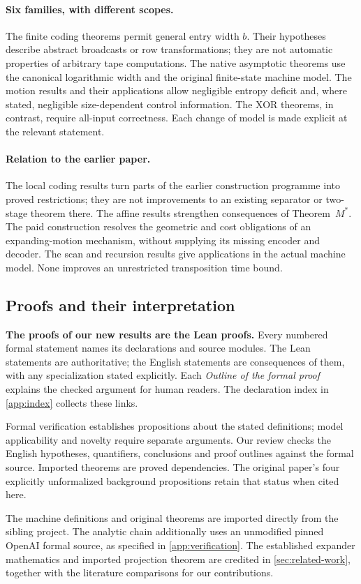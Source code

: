 \paragraph{Six families, with different scopes.}
The finite coding theorems permit general entry width $b$. Their hypotheses
describe abstract broadcasts or row transformations; they are not automatic
properties of arbitrary tape computations. The native asymptotic theorems use
the canonical logarithmic width and the original finite-state machine model.
The motion results and their applications allow negligible entropy deficit
and, where stated, negligible size-dependent control information. The XOR
theorems, in contrast, require all-input correctness. Each change of model is
made explicit at the relevant statement.

\paragraph{Relation to the earlier paper.}
The local coding results turn parts of the earlier construction programme into
proved restrictions; they are not improvements to an existing separator or
two-stage theorem there. The affine results strengthen consequences of
Theorem~$M^*$. The paid construction resolves the geometric and cost obligations
of an expanding-motion mechanism, without supplying its missing encoder and
decoder. The scan and recursion results give applications in the actual
machine model. None improves an unrestricted transposition time bound.

\subsection{Proofs and their interpretation}\label{sec:proof-policy}

\textbf{The proofs of our new results are the Lean proofs.} Every numbered
formal statement names its declarations and source modules. The Lean statements
are authoritative; the English statements are consequences of them, with any
specialization stated explicitly. Each \emph{Outline of the formal proof}
explains the checked argument for human readers. The declaration index in
\cref{app:index} collects these links.

Formal verification establishes propositions about the stated definitions;
model applicability and novelty require separate arguments. Our review checks
the English hypotheses, quantifiers, conclusions and proof outlines against
the formal source. Imported theorems are proved dependencies. The original
paper's four explicitly unformalized background propositions retain that
status when cited here.

The machine definitions and original theorems are imported directly from the
sibling project. The analytic chain additionally uses an unmodified pinned
OpenAI formal source, as specified in \cref{app:verification}. The established
expander mathematics and imported projection theorem are credited in
\cref{sec:related-work}, together with the literature comparisons for our
contributions.
